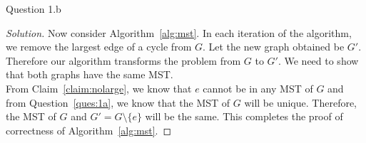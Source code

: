 \begin{solution}{Question 1.b}
\begin{proof}[Solution]
        Now consider Algorithm~\ref{alg:mst}. In each iteration of the algorithm, we remove the largest edge of a cycle from $G$. Let the new graph obtained be $G'$. Therefore our algorithm transforms the problem from $G$ to $G'$. We need to show that both graphs have the same MST.\\
        From Claim~\ref{claim:nolarge}, we know that $e$ cannot be in any MST of $G$ and from Question~\ref{ques:1a}, we know that the MST of $G$ will be unique. Therefore, the MST of $G$ and $G'=G\setminus\{e\}$ will be the same. This completes the proof of correctness of Algorithm~\ref{alg:mst}.
    \end{proof}
\end{solution}
